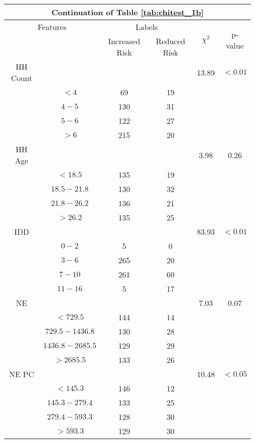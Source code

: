 \begin{table}
\centering
\label{tab:chitest_1b_cont}
\begin{tabular}{c c | c c| c | c}
\hline
\multicolumn{6}{c}{Continuation of Table \ref{tab:chitest_1b}}\\ 
\hline
\multicolumn{2}{c|}{Features}& \multicolumn{2}{c|}{Labels}& \multirow{2}{*}{$\chi^2$} & \multirow{2}{*}{p-value}\\ 
& & Increased Risk & Reduced Risk & & \\ 
\hline
HH Count &  &  & & 13.89 & $< 0.01$ \\ 
& $< 4$ & 69 & 19& & \\ 
& $4-5$ & 130 & 31& & \\ 
& $5-6$ & 122 & 27& & \\ 
& $> 6$ & 215 & 20& & \\ 
\hline 
HH Age &  &  & & 3.98 & 0.26 \\ 
& $< 18.5$ & 135 & 19& & \\ 
& $18.5-21.8$ & 130 & 32& & \\ 
& $21.8-26.2$ & 136 & 21& & \\ 
& $> 26.2$ & 135 & 25& & \\ 
\hline 
IDD &  &  & & 83.93 & $< 0.01$ \\ 
& $0-2$ & 5 & 0& & \\ 
& $3-6$ & 265 & 20& & \\ 
& $7-10$ & 261 & 60& & \\ 
& $11-16$ & 5 & 17& & \\ 
\hline 
NE &  &  & & 7.03 & 0.07 \\ 
& $< 729.5$ & 144 & 14& & \\ 
& $729.5-1436.8$ & 130 & 28& & \\ 
& $1436.8-2685.5$ & 129 & 29& & \\ 
& $> 2685.5$ & 133 & 26& & \\ 
\hline 
NE PC &  &  & & 10.48 & $< 0.05$ \\ 
& $< 145.3$ & 146 & 12& & \\ 
& $145.3-279.4$ & 133 & 25& & \\ 
& $279.4-593.3$ & 128 & 30& & \\ 
& $> 593.3$ & 129 & 30& & \\ 
\hline 
\end{tabular}
\end{table}

